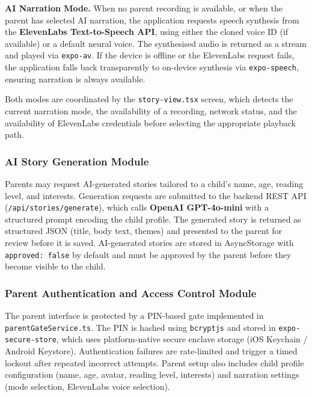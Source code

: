 \textbf{AI Narration Mode.} When no parent recording is available, or when the parent has selected AI narration, the application requests speech synthesis from the \textbf{ElevenLabs Text-to-Speech API}, using either the cloned voice ID (if available) or a default neural voice. The synthesised audio is returned as a stream and played via \texttt{expo-av}. If the device is offline or the ElevenLabs request fails, the application falls back transparently to on-device synthesis via \texttt{expo-speech}, ensuring narration is always available.

Both modes are coordinated by the \texttt{story-view.tsx} screen, which detects the current narration mode, the availability of a recording, network status, and the availability of ElevenLabs credentials before selecting the appropriate playback path.

\subsubsection{AI Story Generation Module}

Parents may request AI-generated stories tailored to a child's name, age, reading level, and interests. Generation requests are submitted to the backend REST API (\texttt{/api/stories/generate}), which calls \textbf{OpenAI GPT-4o-mini} with a structured prompt encoding the child profile. The generated story is returned as structured JSON (title, body text, themes) and presented to the parent for review before it is saved. AI-generated stories are stored in AsyncStorage with \texttt{approved: false} by default and must be approved by the parent before they become visible to the child.

\subsubsection{Parent Authentication and Access Control Module}

The parent interface is protected by a PIN-based gate implemented in \texttt{parentGateService.ts}. The PIN is hashed using \texttt{bcryptjs} and stored in \texttt{expo-secure-store}, which uses platform-native secure enclave storage (iOS Keychain / Android Keystore). Authentication failures are rate-limited and trigger a timed lockout after repeated incorrect attempts. Parent setup also includes child profile configuration (name, age, avatar, reading level, interests) and narration settings (mode selection, ElevenLabs voice selection).

